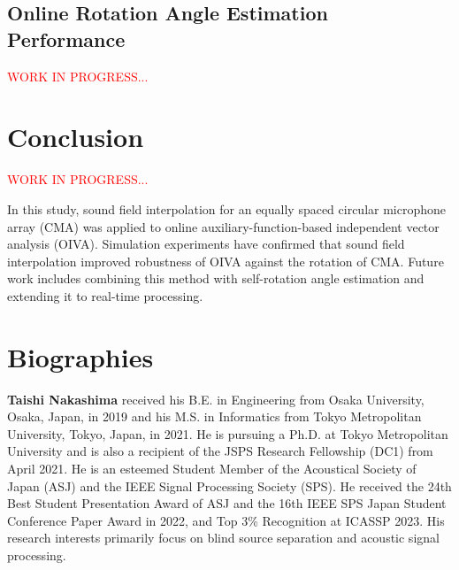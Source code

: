 \documentclass[sip,biber]{now-journal}
\newcommand{\todo}[1]{\textcolor{red}{#1}}
\begin{document}
\subsection{Online Rotation Angle Estimation Performance}
\todo{WORK IN PROGRESS...}

\section{Conclusion}\label{sec:conclusion}
\todo{WORK IN PROGRESS...}

In this study, sound field interpolation for an equally spaced circular microphone array (CMA) was applied to online auxiliary-function-based independent vector analysis (OIVA).
Simulation experiments have confirmed that sound field interpolation improved robustness of OIVA against the rotation of CMA.
Future work includes combining this method with self-rotation angle estimation \cite{Lian:2021:APSIPA} and extending it to real-time processing.

\section*{Biographies}

\noindent\normalsize\textbf{Taishi Nakashima}
received his B.E. in Engineering from Osaka University, Osaka, Japan, in 2019 and his M.S. in Informatics from Tokyo Metropolitan University, Tokyo, Japan, in 2021.
He is pursuing a Ph.D. at Tokyo Metropolitan University and is also a recipient of the JSPS Research Fellowship (DC1) from April 2021.
He is an esteemed Student Member of the Acoustical Society of Japan (ASJ) and the IEEE Signal Processing Society (SPS).
He received the 24th Best Student Presentation Award of ASJ and the 16th IEEE SPS Japan Student Conference Paper Award in 2022, and Top 3\% Recognition at ICASSP 2023.
His research interests primarily focus on blind source separation and acoustic signal processing.
\\
\end{document}
